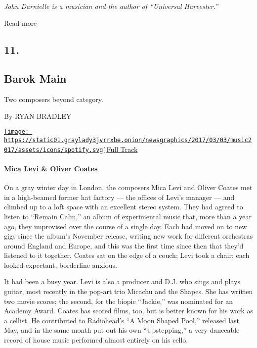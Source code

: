 \emph{John Darnielle is a musician and the author of ``Universal
Harvester.''}

Read more

\hypertarget{11}{%
\subsection{11.}\label{11}}

\hypertarget{--barok-main}{%
\subsection{\texorpdfstring{ Barok
Main}{  Barok Main}}\label{--barok-main}}

Two composers beyond category.

By RYAN BRADLEY

\href{https://open.spotify.com/track/2Dy1MaumORP1kh1sHDXi0w}{\texttt{[image: https://static01.graylady3jvrrxbe.onion/newsgraphics/2017/03/03/music2017/assets/icons/spotify.svg]}Full
Track}

\hypertarget{mica-levi--oliver-coates}{%
\paragraph{Mica Levi \& Oliver Coates}\label{mica-levi--oliver-coates}}

On a gray winter day in London, the composers Mica Levi and Oliver
Coates met in a high-beamed former hat factory --- the offices of Levi's
manager --- and climbed up to a loft space with an excellent stereo
system. They had agreed to listen to ``Remain Calm,'' an album of
experimental music that, more than a year ago, they improvised over the
course of a single day. Each had moved on to new gigs since the album's
November release, writing new work for different orchestras around
England and Europe, and this was the first time since then that they'd
listened to it together. Coates sat on the edge of a couch; Levi took a
chair; each looked expectant, borderline anxious.

It had been a busy year. Levi is also a producer and D.J. who sings and
plays guitar, most recently in the pop-art trio Micachu and the Shapes.
She has written two movie scores; the second, for the biopic ``Jackie,''
was nominated for an Academy Award. Coates has scored films, too, but is
better known for his work as a cellist. He contributed to Radiohead's
``A Moon Shaped Pool,'' released last May, and in the same month put out
his own ``Upstepping,'' a very danceable record of house music performed
almost entirely on his cello.

